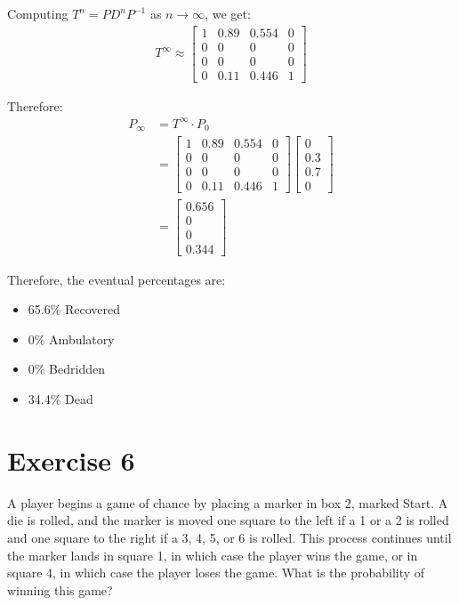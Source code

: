 \documentclass{article}
\begin{document}
Computing $T^n = PD^nP^{-1}$ as $n \to \infty$, we get:
\begin{align*}
T^\infty \approx 
\begin{bmatrix}
1 & 0.89 & 0.554 & 0 \\
0 & 0 & 0 & 0 \\
0 & 0 & 0 & 0 \\
0 & 0.11 & 0.446 & 1
\end{bmatrix}
\end{align*}

Therefore:
\begin{align*}
P_\infty &= T^\infty \cdot P_0 \\
&= 
\begin{bmatrix}
1 & 0.89 & 0.554 & 0 \\
0 & 0 & 0 & 0 \\
0 & 0 & 0 & 0 \\
0 & 0.11 & 0.446 & 1
\end{bmatrix}
\begin{bmatrix}
0 \\
0.3 \\
0.7 \\
0
\end{bmatrix} \\
&= 
\begin{bmatrix}
0.656 \\
0 \\
0 \\
0.344
\end{bmatrix}
\end{align*}

Therefore, the eventual percentages are:
\begin{itemize}
    \item 65.6\% Recovered
    \item 0\% Ambulatory
    \item 0\% Bedridden
    \item 34.4\% Dead
\end{itemize}

\newpage

\section*{Exercise 6}
A player begins a game of chance by placing a marker in box 2, marked Start. A die is rolled, and the marker is moved one square to the left if a 1 or a 2 is rolled and one square to the right if a 3, 4, 5, or 6 is rolled. This process continues until the marker lands in square 1, in which case the player wins the game, or in square 4, in which case the player loses the game. What is the probability of winning this game?
\end{document}
